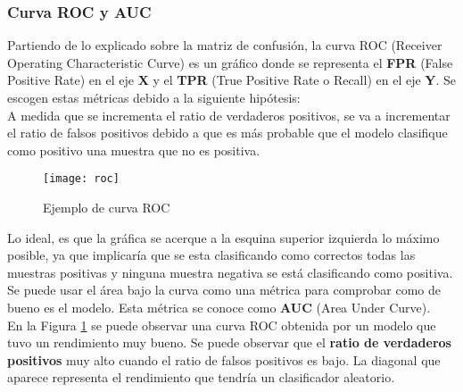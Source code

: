 \subsubsection*{Curva ROC y AUC}
Partiendo de lo explicado sobre la matriz de confusión, la curva ROC (Receiver Operating Characteristic Curve) es un gráfico donde se representa el \textbf{FPR} (False Positive Rate) en el eje \textbf{X} y el \textbf{TPR} (True Positive Rate o Recall) en el eje \textbf{Y}. Se escogen estas métricas debido a la siguiente hipótesis:\\
A medida que se incrementa el ratio de verdaderos positivos, se va a incrementar el ratio de falsos positivos debido a que es más probable que el modelo clasifique como positivo una muestra que no es positiva.
\begin{figure}[H]
	\centering
	\texttt{[image: roc]}
	\caption{Ejemplo de curva ROC}
	\label{fig:roc}
\end{figure}
Lo ideal, es que la gráfica se acerque a la esquina superior izquierda lo máximo posible, ya que implicaría que se esta clasificando como correctos todas las muestras positivas y ninguna muestra negativa se está clasificando como positiva.\\
Se puede usar el área bajo la curva como una métrica para comprobar como de bueno es el modelo. Esta métrica se conoce como \textbf{AUC} (Area Under Curve).\\
En la Figura \ref{fig:roc} se puede observar una curva ROC obtenida por un modelo que tuvo un rendimiento muy bueno. Se puede observar que el \textbf{ratio de verdaderos positivos} muy alto cuando el ratio de falsos positivos es bajo. La diagonal que aparece representa el rendimiento que tendría un clasificador aleatorio.
\linebreak
